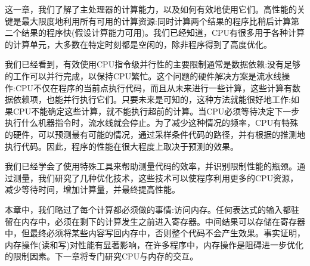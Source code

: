 这一章，我们了解了主处理器的计算能力，以及如何有效地使用它们。高性能的关键是最大限度地利用所有可用的计算资源:同时计算两个结果的程序比稍后计算第二个结果的程序快(假设计算能力可用)。我们已经知道，CPU有很多用于各种计算的计算单元，大多数在特定时刻都是空闲的，除非程序得到了高度优化。

我们已经看到，有效使用CPU指令级并行性的主要限制通常是数据依赖:没有足够的工作可以并行完成，以保持CPU繁忙。这个问题的硬件解决方案是流水线操作:CPU不仅在程序的当前点执行代码，而且从未来进行一些计算，这些计算有数据依赖项，也能并行执行它们。只要未来是可知的，这种方法就能很好地工作:如果CPU不能确定这些计算，就不能执行超前的计算。当CPU必须等待决定下一步执行什么机器指令时，流水线就会停止。为了减少这种情况的频率，CPU有特殊的硬件，可以预测最有可能的情况，通过采样条件代码的路径，并有根据的推测地执行代码。因此，程序的性能在很大程度上取决于预测的效果。

我们已经学会了使用特殊工具来帮助测量代码的效率，并识别限制性能的瓶颈。通过测量，我们研究了几种优化技术，这些技术可以使程序利用更多的CPU资源，减少等待时间，增加计算量，并最终提高性能。

本章中，我们略过了每个计算都必须做的事情:访问内存。任何表达式的输入都驻留在内存中，必须在剩下的计算发生之前进入寄存器。中间结果可以存储在寄存器中，但最终必须将某些内容写回内存中，否则整个代码不会产生效果。事实证明，内存操作(读和写)对性能有显著影响，在许多程序中，内存操作是阻碍进一步优化的限制因素。下一章将专门研究CPU与内存的交互。







